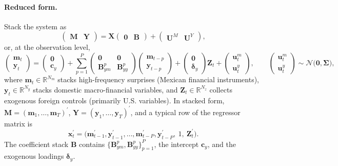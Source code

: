 \documentclass[12pt, reqno]{article}
\begin{document}
\paragraph{Reduced form.}
Stack the system as
\begin{equation}
\label{eq:A1_stack}
\begin{pmatrix}
\boldsymbol{M} & {\boldsymbol{Y}}
\end{pmatrix}
=
\boldsymbol{X}
\begin{pmatrix}
\boldsymbol{0} & \boldsymbol{B}
\end{pmatrix}
+\begin{pmatrix}
\boldsymbol{U}^{M} & \boldsymbol{U}^{{Y}}
\end{pmatrix},
\end{equation}
or, at the observation level,
\begin{equation}
\label{eq:A2_blocks}
\begin{pmatrix}
\boldsymbol{m}_t\\
\boldsymbol{y}_t
\end{pmatrix}
=
\begin{pmatrix}
\mathbf{0}\\
\boldsymbol{c}_{y}
\end{pmatrix}
+\sum_{p=1}^{P}
\begin{pmatrix}
\mathbf{0} & \mathbf{0}\\
\boldsymbol{B}^{p}_{ym} & \boldsymbol{B}^{p}_{yy}
\end{pmatrix}
\begin{pmatrix}
\boldsymbol{m}_{t-p}\\
\boldsymbol{y}_{t-p}
\end{pmatrix}
+
\begin{pmatrix}
\mathbf{0}\\
\boldsymbol{\delta}_{y}
\end{pmatrix}
\boldsymbol{Z}_t
+
\begin{pmatrix}
\boldsymbol{u}^{m}_t\\
\boldsymbol{u}^{y}_t
\end{pmatrix},
\qquad
\begin{pmatrix}
\boldsymbol{u}^{m}_t\\
\boldsymbol{u}^{y}_t
\end{pmatrix}\sim\mathcal{N}\!\big(\mathbf{0},\boldsymbol{\Sigma}\big),
\end{equation}
where $\boldsymbol{m}_t\in\mathbb{R}^{N_m}$ stacks high-frequency surprises (Mexican financial instruments), $\boldsymbol{y}_t\in\mathbb{R}^{N_y}$ stacks domestic macro-financial variables, and $\boldsymbol{Z}_t\in\mathbb{R}^{N_z}$ collects exogenous foreign controls (primarily U.S. variables). In stacked form, $\boldsymbol{M}=(\boldsymbol{m}_1,\dots,\boldsymbol{m}_T)^\prime$, ${\boldsymbol{Y}}=(\boldsymbol{y}_1,\dots,\boldsymbol{y}_T)^\prime$, and a typical row of the regressor matrix is
\[
\boldsymbol{x}_t^\prime=\big(\boldsymbol{m}_{t-1}^\prime,\boldsymbol{y}_{t-1}^\prime,\ldots,\boldsymbol{m}_{t-P}^\prime,\boldsymbol{y}_{t-P}^\prime,\ 1,\ \boldsymbol{Z}_t^\prime\big).
\]
The coefficient stack $\boldsymbol{B}$ contains $\{\boldsymbol{B}^{p}_{ym},\boldsymbol{B}^{p}_{yy}\}_{p=1}^{P}$, the intercept $\boldsymbol{c}_y$, and the exogenous loadings $\boldsymbol{\delta}_y$.
\end{document}
